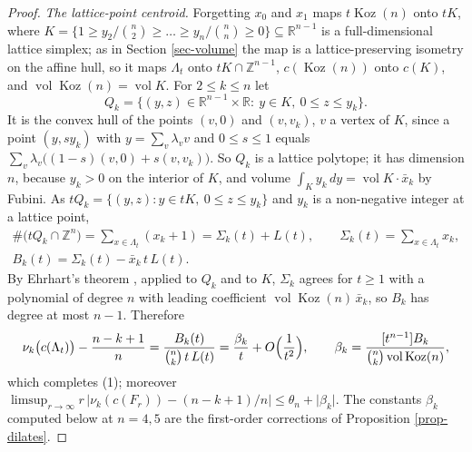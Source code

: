 \documentclass[11pt, a4paper, abstract=yes]{scrartcl}
\theoremstyle{definition}
\theoremstyle{remark}
\theoremstyle{plain}
\theoremstyle{remark}
\theoremstyle{plain}
\newcommand{\Koz}{\operatorname{Koz}}
\newcommand{\vol}{\operatorname{vol}}
\begin{document}
\begin{proof}
\emph{The lattice-point centroid.} Forgetting \(x_0\) and \(x_1\) maps \(t\Koz(n)\) onto \(tK\), where
\(K=\lbrace1\ge y_2/\binom n2\ge\dots\ge y_n/\binom nn\ge0\rbrace\subseteq\mathbb R^{n-1}\) is a
full-dimensional lattice simplex; as in Section \ref{sec-volume} the map is a lattice-preserving
isometry on the affine hull, so it maps \(\Lambda_t\) onto \(tK\cap\mathbb Z^{n-1}\), \(c(\Koz(n))\)
onto \(c(K)\), and \(\vol\Koz(n)=\vol K\). For \(2\le k\le n\) let
\begin{equation}\label{eq:Qk}
  Q_k=\bigl\lbrace(y,z)\in\mathbb R^{n-1}\times\mathbb R:\ y\in K,\ 0\le z\le y_k\bigr\rbrace .
\end{equation}
It is the convex hull of the points \((v,0)\) and \((v,v_k)\), \(v\) a vertex of \(K\), since a point
\((y,sy_k)\) with \(y=\sum_v\lambda_vv\) and \(0\le s\le1\) equals
\(\sum_v\lambda_v\bigl((1-s)(v,0)+s(v,v_k)\bigr)\). So \(Q_k\) is a lattice polytope; it has dimension
\(n\), because \(y_k>0\) on the interior of \(K\), and volume \(\int_Ky_k\,dy=\vol K\cdot\bar x_k\) by
Fubini. As \(tQ_k=\lbrace(y,z):y\in tK,\ 0\le z\le y_k\rbrace\) and \(y_k\) is a non-negative integer
at a lattice point,
\begin{equation}\label{eq:Sigmak}
\begin{gathered}
  \#\bigl(tQ_k\cap\mathbb Z^n\bigr)=\sum_{x\in\Lambda_t}(x_k+1)=\Sigma_k(t)+L(t),\qquad
  \Sigma_k(t)=\sum_{x\in\Lambda_t}x_k ,\\
  B_k(t)=\Sigma_k(t)-\bar x_k\,t\,L(t) .
\end{gathered}
\end{equation}
By Ehrhart's theorem \autocite{BeckRobins2015}, applied to \(Q_k\) and to \(K\), \(\Sigma_k\) agrees for
\(t\ge1\) with a polynomial of degree \(n\) with leading coefficient \(\vol\Koz(n)\,\bar x_k\), so
\(B_k\) has degree at most \(n-1\). Therefore
\begin{equation}\label{eq:betak}
  \nu_k\bigl(c(\Lambda_t)\bigr)-\frac{n-k+1}n=\frac{B_k(t)}{\binom nk\,t\,L(t)}
  =\frac{\beta_k}t+O\Bigl(\frac1{t^2}\Bigr),\qquad \beta_k=\frac{[t^{n-1}]B_k}{\binom nk\vol\Koz(n)} ,
\end{equation}
which completes (1); moreover
\(\limsup_{r\to\infty}r\,\lvert\nu_k(c(F_r))-(n-k+1)/n\rvert\le\theta_n+\lvert\beta_k\rvert\). The
constants \(\beta_k\) computed below at \(n=4,5\) are the first-order corrections of
Proposition \ref{prop-dilates}.


\end{proof}
\end{document}
